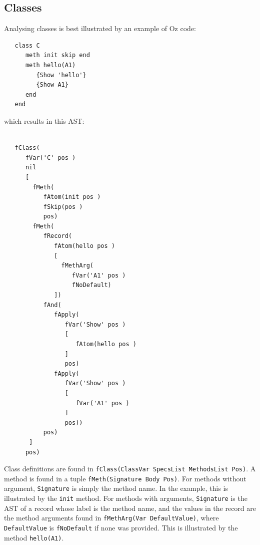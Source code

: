 \documentclass[a4paper]{memoir}
\begin{document}
\pagebreak[4]

\subsection{Classes}
Analysing classes is best illustrated by an example of Oz code:

\begin{lstlisting}
   class C
      meth init skip end
      meth hello(A1)
         {Show 'hello'}
         {Show A1}
      end
   end
\end{lstlisting}
which results in this AST:
\begin{lstlisting}

   fClass(
      fVar('C' pos )
      nil
      [
        fMeth(
           fAtom(init pos )
           fSkip(pos )
           pos)
        fMeth(
           fRecord(
              fAtom(hello pos )
              [
                fMethArg(
                   fVar('A1' pos )
                   fNoDefault)
              ])
           fAnd(
              fApply(
                 fVar('Show' pos )
                 [
                    fAtom(hello pos )
                 ]
                 pos)
              fApply(
                 fVar('Show' pos )
                 [
                    fVar('A1' pos )
                 ]
                 pos))
           pos)
       ]
      pos)
\end{lstlisting}

Class definitions are found in 
\lstinline!fClass(ClassVar SpecsList MethodsList Pos)!.
A method is found in a tuple \lstinline!fMeth(Signature Body Pos)!.
For methods without argument, \lstinline!Signature! is simply the method name.
In the example, this is illustrated by the \lstinline!init! method.
For methods with arguments, \lstinline!Signature! is the AST of a record whose label is the method name, and the
values in the record are the method arguments found in 
\lstinline!fMethArg(Var DefaultValue)!, where \lstinline!DefaultValue! is
\lstinline!fNoDefault! if none was provided.
This is illustrated by the method \lstinline!hello(A1)!.
\end{document}
